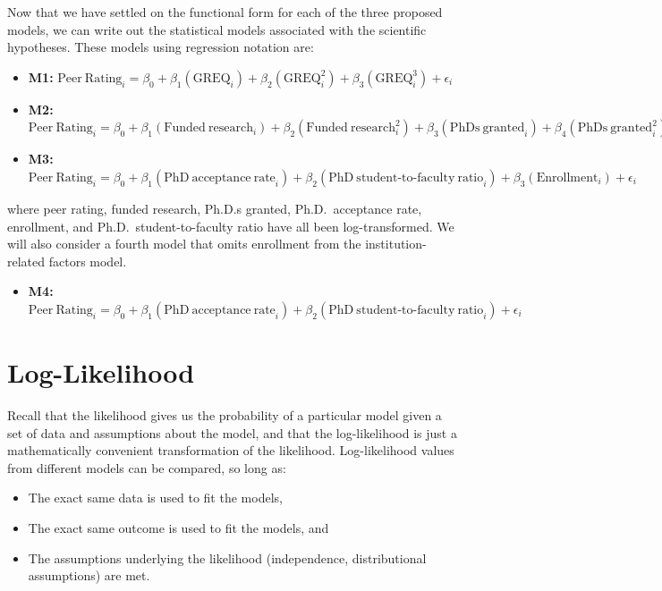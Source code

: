 \documentclass[]{book}
\providecommand{\tightlist}{%
  \setlength{\itemsep}{0pt}\setlength{\parskip}{0pt}}
\begin{document}
Now that we have settled on the functional form for each of the three proposed models, we can write out the statistical models associated with the scientific hypotheses. These models using regression notation are:

\begin{itemize}
\tightlist
\item
  \textbf{M1:} \(\mathrm{Peer~Rating}_i = \beta_0 + \beta_1(\mathrm{GREQ}_i) + \beta_2(\mathrm{GREQ}^2_i) + \beta_3(\mathrm{GREQ}^3_i) + \epsilon_i\)
\item
  \textbf{M2:} \(\mathrm{Peer~Rating}_i = \beta_0 + \beta_1(\mathrm{Funded~research}_i) + \beta_2(\mathrm{Funded~research}^2_i) + \beta_3(\mathrm{PhDs~granted}_i) + \beta_4(\mathrm{PhDs~granted}^2_i) + \epsilon_i\)
\item
  \textbf{M3:} \(\mathrm{Peer~Rating}_i = \beta_0 + \beta_1(\mathrm{PhD~acceptance~rate}_i) + \beta_2(\mathrm{PhD~student\mbox{-}to\mbox{-}faculty~ratio}_i) + \beta_3(\mathrm{Enrollment}_i) + \epsilon_i\)
\end{itemize}

where peer rating, funded research, Ph.D.s granted, Ph.D.~acceptance rate, enrollment, and Ph.D.~student-to-faculty ratio have all been log-transformed. We will also consider a fourth model that omits enrollment from the institution-related factors model.

\begin{itemize}
\tightlist
\item
  \textbf{M4:} \(\mathrm{Peer~Rating}_i = \beta_0 + \beta_1(\mathrm{PhD~acceptance~rate}_i) + \beta_2(\mathrm{PhD~student\mbox{-}to\mbox{-}faculty~ratio}_i) + \epsilon_i\)
\end{itemize}

\hypertarget{log-likelihood-1}{%
\section{Log-Likelihood}\label{log-likelihood-1}}

Recall that the likelihood gives us the probability of a particular model given a set of data and assumptions about the model, and that the log-likelihood is just a mathematically convenient transformation of the likelihood. Log-likelihood values from different models can be compared, so long as:

\begin{itemize}
\tightlist
\item
  The exact same data is used to fit the models,
\item
  The exact same outcome is used to fit the models, and
\item
  The assumptions underlying the likelihood (independence, distributional assumptions) are met.
\end{itemize}
\end{document}
